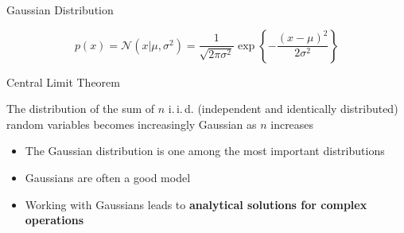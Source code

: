 \begin{frame}{Gaussian Distribution}{}\important
	
	\vspace*{-4mm}
	\begin{equation}
		p(x) = \mathcal{N}(x \vert \mu, \sigma^2) = \frac{1}{\sqrt{2 \pi \sigma^2}} \exp\left\{ -\frac{(x - \mu)^2}{2 \sigma^2} \right\}
	\end{equation}
\end{frame}


\begin{frame}{Central Limit Theorem}{}\important
	\begin{boxBlue}

		The distribution of the sum of $n$ i.\,i.\,d. (independent and identically distributed) random variables becomes increasingly Gaussian as $n$ increases
	\end{boxBlue}

	\begin{itemize}
		\item The Gaussian distribution is one among the most important distributions
		\item Gaussians are often a good model
		\item Working with Gaussians leads to \textbf{analytical solutions for complex operations}
	\end{itemize}
\end{frame}


